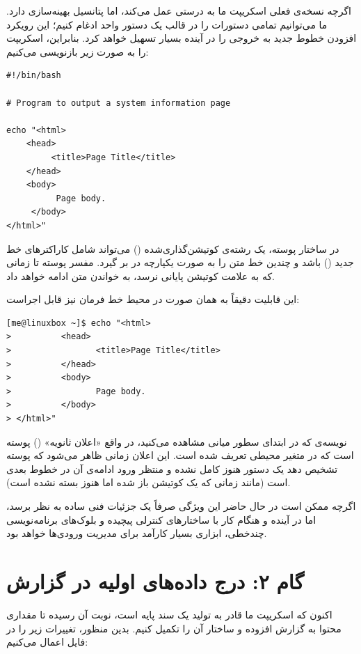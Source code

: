 اگرچه نسخه‌ی فعلی اسکریپت ما به درستی عمل می‌کند، اما پتانسیل بهینه‌سازی دارد. ما می‌توانیم تمامی دستورات  را در قالب یک دستور واحد ادغام کنیم؛ این رویکرد افزودن خطوط جدید به خروجی را در آینده بسیار تسهیل خواهد کرد. بنابراین، اسکریپت را به صورت زیر بازنویسی می‌کنیم:

\begin{latin}
\begin{lstlisting}
#!/bin/bash

# Program to output a system information page

echo "<html>
    <head>
         <title>Page Title</title>
    </head>
    <body>
          Page body.
     </body>
</html>"
\end{lstlisting}
\end{latin}

در ساختار پوسته، یک رشته‌ی کوتیشن‌گذاری‌شده () می‌تواند شامل کاراکترهای خط جدید () باشد و چندین خط متن را به صورت یکپارچه در بر گیرد. مفسر پوسته تا زمانی که به علامت کوتیشن پایانی نرسد، به خواندن متن ادامه خواهد داد.

این قابلیت دقیقاً به همان صورت در محیط خط فرمان نیز قابل اجراست:

\begin{latin}
\begin{lstlisting}
[me@linuxbox ~]$ echo "<html>
>          <head>
>                 <title>Page Title</title>
>          </head>
>          <body>
>                 Page body.
>          </body>
> </html>"
\end{lstlisting}
\end{latin}

نویسه‌ی \cmd{>} که در ابتدای سطور میانی مشاهده می‌کنید، در واقع «اعلان ثانویه» () پوسته است که در متغیر محیطی  تعریف شده است. این اعلان زمانی ظاهر می‌شود که پوسته تشخیص دهد یک دستور هنوز کامل نشده و منتظر ورود ادامه‌ی آن در خطوط بعدی است (مانند زمانی که یک کوتیشن باز شده اما هنوز بسته نشده است).

اگرچه ممکن است در حال حاضر این ویژگی صرفاً یک جزئیات فنی ساده به نظر برسد، اما در آینده و هنگام کار با ساختارهای کنترلی پیچیده و بلوک‌های برنامه‌نویسی چندخطی، ابزاری بسیار کارآمد برای مدیریت ورودی‌ها خواهد بود.

\section{گام ۲: درج داده‌های اولیه در گزارش}

اکنون که اسکریپت ما قادر به تولید یک سند  پایه است، نوبت آن رسیده تا مقداری محتوا به گزارش افزوده و ساختار آن را تکمیل کنیم. بدین منظور، تغییرات زیر را در فایل اعمال می‌کنیم:

